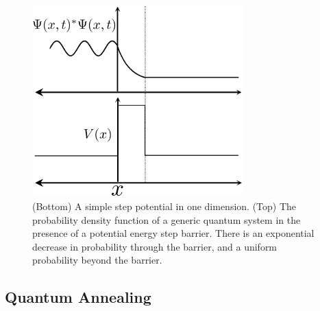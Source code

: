 \documentclass[11pt]{afthesis}
\begin{document}
	\begin{figure}[ht!]
		
		\begin{center}
			\includegraphics[width = 3.2in]{figures/tunneling_ex.eps}
		\end{center}
		\caption{(Bottom) A simple step potential in one dimension. (Top) The probability density function of a generic quantum system in the presence of a potential energy step barrier. There is an exponential decrease in probability through the barrier, and a uniform probability beyond the barrier.}
		
		\label{fig:quantum_tunneling}
	\end{figure}
	
	\subsection{Quantum Annealing}
	
\end{document}
